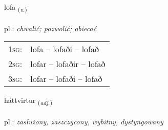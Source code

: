 \documentclass[frontgrid, backgrid]{flacards}\usepackage[]{graphicx}\usepackage[]{xcolor}
\begin{document}
\renewcommand{\flhead}{\vskip5pt \fboxsep=0pt {\small\bfseries\footnotesize Sagnorð | Verb}}
\renewcommand{\fcfoot}{\vskip5pt \fboxsep=0pt \hspace{2pt}{\small\bfseries\footnotesize 2K}}

\renewcommand{\blhead}{\vskip5pt {\small\bfseries\footnotesize Sagnorð | Verb }}
\renewcommand{\bcfoot}{\vskip5pt \hspace{2pt}{\small\bfseries\footnotesize 2K}}


{lofa \small{\textsubscript{(\textit{v.})}} \\[1ex] %
\textphonetic{[lɔːva]} \\
pl.: \emph{chwalić; pozwolić; obiecać} \\  [2ex]
\renewcommand*{\arraystretch}{0.8}
\begin{tabular}{p{1cm}l}
\textsc{1sg}: & lofa -- lofaði -- lofað \\ 
\textsc{2sg}: & lofar -- lofaðir -- lofað \\ 
\textsc{3sg}: & lofar -- lofaði -- lofað \\ 
\end{tabular}
}

\renewcommand{\flhead}{\vskip5pt \fboxsep=0pt {\small\bfseries\footnotesize Lýsingarorð | Adjective}}
\renewcommand{\fcfoot}{\vskip5pt \fboxsep=0pt \hspace{2pt}{\small\bfseries\footnotesize 2K}}

\renewcommand{\blhead}{\vskip5pt {\small\bfseries\footnotesize Lýsingarorð | Adjective }}
\renewcommand{\bcfoot}{\vskip5pt \hspace{2pt}{\small\bfseries\footnotesize 2K}}


{háttvirtur \small{\textsubscript{(\textit{adj.})}} \\[1ex] %
 \\
pl.: \emph{zasłużony, zaszczycony, wybitny, dystyngowany} \\  [2ex]
\renewcommand*{\arraystretch}{0.8}
}
\end{document}
